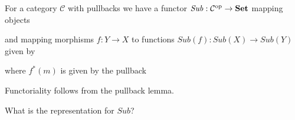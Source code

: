 \begin{definition}
	For a category $\mathcal{C}$ with pullbacks we have a functor $\mathit{Sub}: \mathcal{C}^{\mathrm{op}} \to  \mathbf {Set}$ mapping objects
	
\begin{center}
\end{center}
and mapping morphisms $f: Y \to X$ to functions $\mathit{Sub}(f): \mathit{Sub}(X) \to \mathit{Sub}(Y)$ given by
\begin{center}
\end{center}
where $f^*(m)$ is given by the pullback
\begin{center}
\end{center}
\end{definition}
\begin{remark}
Functoriality follows from the pullback lemma.	
\end{remark}

\begin{exercise}
What is the representation for $\mathit{Sub}$?
\begin{center}
\end{center}	
\end{exercise}
 